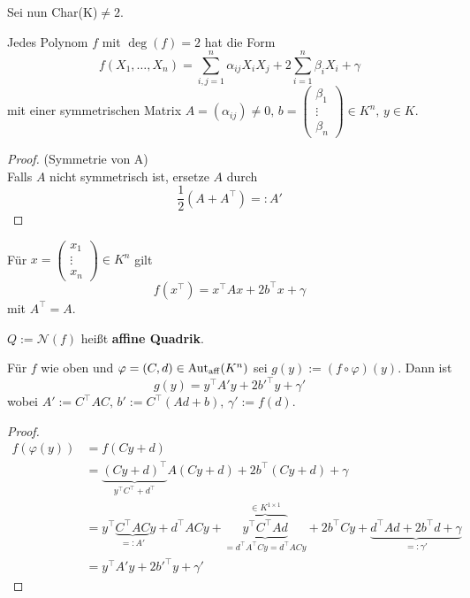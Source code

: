 \documentclass[parskip,a4paper,twoside,DIV15,BCOR12mm]{scrbook}
\begin{document}
Sei nun Char(K)\(\neq 2\).

\begin{prep}
Jedes Polynom \(f\) mit \(\deg(f)=2\) hat die Form
\[
f(X_{1},\dots,X_{n})=\sum_{i,j=1}^{n}{\alpha_{ij}X_{i}X_{j}}+2\sum_{i=1}^{n}{\beta_{i}X_{i}}+\gamma
\]
mit einer symmetrischen Matrix \(A=(\alpha_{ij})\neq 0,\,b=\begin{pmatrix}\beta_{1}\\\vdots\\\beta_{n}\end{pmatrix}\in K^{n},\,y\in K\).
\end{prep}

\begin{proof}(Symmetrie von A)\\
Falls \(A\) nicht symmetrisch ist, ersetze \(A\) durch 
\[
\frac{1}{2}\left(A+A^{\top}\right)=:A'
\]
\end{proof}

\begin{note}
Für \(x=\begin{pmatrix} x_{1}\\\vdots\\ x_{n}\end{pmatrix}\in K^{n}\)
gilt
\[
f\left(x^{\top}\right)=x^{\top}Ax+2b^{\top}x+\gamma
\]
mit \(A^{\top}=A\).

\(Q:=\mathcal{N}(f)\) heißt \textbf{affine Quadrik}.
\end{note} 

\begin{lemma}
Für \(f\) wie oben und \(\varphi=(C,d)\in\operatorname{Aut_{aff}}(K^{n})\) sei 
\(g(y):=(f\circ\varphi)(y)\). Dann ist
\[
g(y)=y^{\top}A'y+2b'^{\top}y+\gamma'
\]
wobei \(A':=C^{\top}AC,\,b':=C^{\top}(Ad+b),\,\gamma':=f(d)\).
\end{lemma}
\begin{proof}
\begin{align*}
f\left(\varphi(y)\right)&=f(Cy+d)\\
&=\underbrace{(Cy+d)^{\top}}_{y^{\top}C^{\top}+d^{\top}}A(Cy+d)+2b^{\top}(Cy+d)+\gamma\\
&=y^{\top}\underbrace{C^{\top}AC}_{=:A'}y+d^{\top}ACy+
    \underbrace{\overbrace{y^{\top}C^{\top}Ad}}^{\in K^{1\times 1}}_{=d^{\top}A^{\top}Cy = d^{\top}ACy}
    +2b^{\top}Cy+\underbrace{d^{\top}Ad+2b^{\top}d+\gamma}_{=:\gamma'}\\
&=y^{\top}A'y+2b'^{\top}y+\gamma'
\end{align*}
\end{proof}
\end{document}
